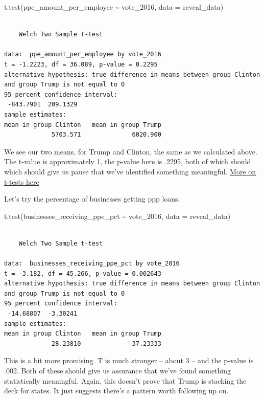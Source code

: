 \documentclass[
  letterpaper,
  DIV=11,
  numbers=noendperiod]{scrreprt}
\newenvironment{Shaded}{\begin{snugshade}}{\end{snugshade}}
\newcommand{\AttributeTok}[1]{\textcolor[rgb]{0.40,0.45,0.13}{#1}}
\newcommand{\FunctionTok}[1]{\textcolor[rgb]{0.28,0.35,0.67}{#1}}
\newcommand{\NormalTok}[1]{\textcolor[rgb]{0.00,0.23,0.31}{#1}}
\newcommand{\SpecialCharTok}[1]{\textcolor[rgb]{0.37,0.37,0.37}{#1}}
\begin{document}
\begin{Shaded}
\begin{Highlighting}[]
\FunctionTok{t.test}\NormalTok{(ppe\_amount\_per\_employee }\SpecialCharTok{\textasciitilde{}}\NormalTok{ vote\_2016, }\AttributeTok{data =}\NormalTok{ reveal\_data)}
\end{Highlighting}
\end{Shaded}

\begin{verbatim}

    Welch Two Sample t-test

data:  ppe_amount_per_employee by vote_2016
t = -1.2223, df = 36.089, p-value = 0.2295
alternative hypothesis: true difference in means between group Clinton and group Trump is not equal to 0
95 percent confidence interval:
 -843.7901  209.1329
sample estimates:
mean in group Clinton   mean in group Trump 
             5703.571              6020.900 
\end{verbatim}

We see our two means, for Trump and Clinton, the same as we calculated
above. The t-value is approximately 1, the p-value here is .2295, both
of which should which should give us pause that we've identified
something meaningful.
\href{https://conjointly.com/kb/statistical-student-t-test/}{More on
t-tests here}

Let's try the percentage of businesses getting ppp loans.

\begin{Shaded}
\begin{Highlighting}[]
\FunctionTok{t.test}\NormalTok{(businesses\_receiving\_ppe\_pct }\SpecialCharTok{\textasciitilde{}}\NormalTok{ vote\_2016, }\AttributeTok{data =}\NormalTok{ reveal\_data)}
\end{Highlighting}
\end{Shaded}

\begin{verbatim}

    Welch Two Sample t-test

data:  businesses_receiving_ppe_pct by vote_2016
t = -3.182, df = 45.266, p-value = 0.002643
alternative hypothesis: true difference in means between group Clinton and group Trump is not equal to 0
95 percent confidence interval:
 -14.68807  -3.30241
sample estimates:
mean in group Clinton   mean in group Trump 
             28.23810              37.23333 
\end{verbatim}

This is a bit more promising. T is much stronger -- about 3 -- and the
p-value is .002. Both of these should give us assurance that we've found
something statistically meaningful. Again, this doesn't prove that Trump
is stacking the deck for states. It just suggests there's a pattern
worth following up on.
\end{document}

